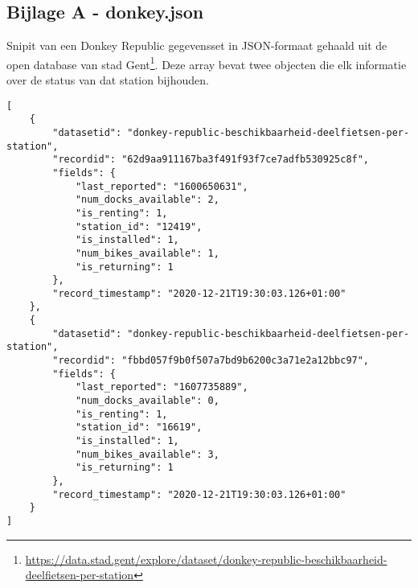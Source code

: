 \begin{appendices}
\section*{Bijlage A - donkey.json}
\label{app:donkey.json}
Snipit van een Donkey Republic gegevensset in JSON-formaat gehaald uit de open database van stad Gent\footnote{\url{https://data.stad.gent/explore/dataset/donkey-republic-beschikbaarheid-deelfietsen-per-station}}. Deze array bevat twee objecten die elk informatie over de status van dat station bijhouden.
\begin{code}
\begin{verbatim}
[
    {
        "datasetid": "donkey-republic-beschikbaarheid-deelfietsen-per-station",
        "recordid": "62d9aa911167ba3f491f93f7ce7adfb530925c8f",
        "fields": {
            "last_reported": "1600650631",
            "num_docks_available": 2,
            "is_renting": 1,
            "station_id": "12419",
            "is_installed": 1,
            "num_bikes_available": 1,
            "is_returning": 1
        },
        "record_timestamp": "2020-12-21T19:30:03.126+01:00"
    },
    {
        "datasetid": "donkey-republic-beschikbaarheid-deelfietsen-per-station",
        "recordid": "fbbd057f9b0f507a7bd9b6200c3a71e2a12bbc97",
        "fields": {
            "last_reported": "1607735889",
            "num_docks_available": 0,
            "is_renting": 1,
            "station_id": "16619",
            "is_installed": 1,
            "num_bikes_available": 3,
            "is_returning": 1
        },
        "record_timestamp": "2020-12-21T19:30:03.126+01:00"
    }
]
\end{verbatim}
\end{code}

\clearpage

\end{appendices}
